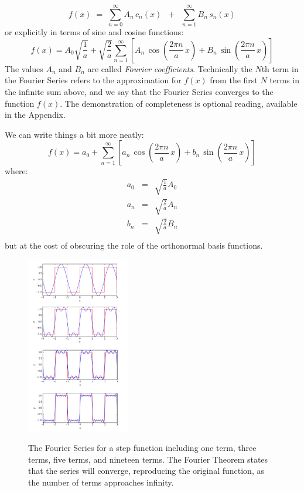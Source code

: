 \documentclass[12pt]{book}
\begin{document}
\begin{equation}
f(x) \; = \; \sum_{n=0}^{\infty}  A_n \, c_n(x)  \; \; + \; \; \sum_{n=1}^{\infty} B_n \, s_n(x) \label{eqn:bfs}
\end{equation}
or explicitly in terms of sine and cosine functions:
\begin{equation}
f(x) = A_0 \sqrt{\frac{1}{a}} + \sqrt{\frac{2}{a}} \sum_{n=1}^{\infty}  \left[ A_n \, \cos\left(\frac{2\pi n}{a} \, x \right) + B_n \, \sin\left(\frac{2\pi n}{a} \, x \right)\right]\label{eqn :lfs}
\end{equation}
The values $A_n$ and $B_n$ are called {\em Fourier coefficients}.  Technically the $N$th term in the Fourier Series refers to the approximation for $f(x)$ from the first $N$ terms in the infinite sum above, and we say that the Fourier Series converges to the function $f(x)$.  The demonstration of completeness is optional reading, available in the Appendix.

We can write things a bit more neatly:
\begin{equation}
f(x) = a_0 + \sum_{n=1}^{\infty}  \left[ a_n \, \cos\left(\frac{2\pi n}{a} \, x \right) + b_n \, \sin\left(\frac{2\pi n}{a} \, x \right) \right]\label{eqn :lfs}
\end{equation}
where:
\begin{eqnarray*}
a_0 &=& \sqrt{\frac{1}{a}} A_0\\
a_n &=& \sqrt{\frac{2}{a}} A_n\\
b_n &=& \sqrt{\frac{2}{a}} B_n\\
\end{eqnarray*}
but at the cost of obscuring the role of the orthonormal basis functions.

\begin{figure}[thb]
\begin{center}
{\includegraphics[width=0.40\textwidth]{figs/fsall.pdf}}
\end{center}
\caption{\label{fig:fall} The Fourier Series for a step function including one term, three terms, five terms, and nineteen terms.  The Fourier Theorem states that the series will converge, reproducing the original function, as the number of terms approaches infinity.}
\end{figure}
\end{document}
